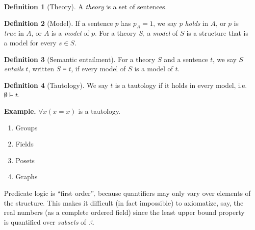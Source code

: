 \documentclass{article}
\theoremstyle{definition}
\newtheorem{definition}{Definition}
\numberwithin{definition}{section}
\newcommand{\entails}{\models}
\begin{document}
\begin{definition}[Theory]
A \textit{theory} is a set of sentences.
\end{definition}
\begin{definition}[Model]
If a sentence $p$ has $p_{A}=1$, we say $p$ \textit{holds} in $A$, or $p$ is \textit{true} in $A$, or $A$ is a \textit{model} of $p$. For a theory $S$, a \textit{model} of $S$ is a structure that is a model for every $s \in S$. 
\end{definition}
\begin{definition}[Semantic entailment]
For a theory $S$ and a sentence $t$, we say $S$ \textit{entails} $t$, written $S \entails t$, if every model of $S$ is a model of $t$. 
\end{definition}
\begin{definition}[Tautology]
We say $t$ is a tautology if it holds in every model, i.e. $\emptyset \entails t$. 
\end{definition}
\textbf{Example.} $\forall x (x=x)$ is a tautology. 
\begin{enumerate}[i]
\item Groups
\item Fields
\item Posets
\item Graphs
\end{enumerate}

Predicate logic is ``first order'', because quantifiers may only vary over elements of the structure. This makes it difficult (in fact impossible) to axiomatize, say, the real numbers (as a complete ordered field) since the least upper bound property is quantified over \textit{subsets} of $\mathbb{R}$. 
\end{document}
